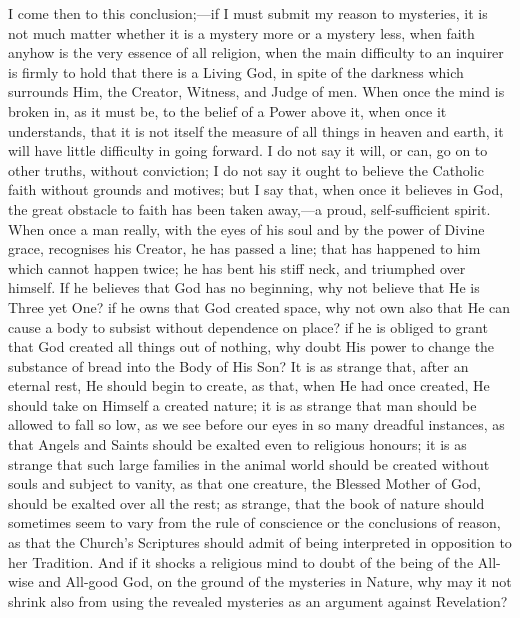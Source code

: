 I come then to this conclusion;—if I must submit my reason to
mysteries, it is not much matter whether it is a mystery more or a
mystery less, when faith anyhow is the very essence of all religion,
when the main difficulty to an inquirer is firmly to hold that there
is a Living God, in spite of the darkness which surrounds Him, the
Creator, Witness, and Judge of men. When once the mind is broken in,
as it must be, to the belief of a Power above it, when once it
understands, that it is not itself the measure of all things in heaven
and earth, it will have little difficulty in going forward. I do not
say it will, or can, go on to other truths, without conviction; I do
not say it ought to believe the Catholic faith without grounds and
motives; but I say that, when once it believes in God, the great
obstacle to faith has been taken away,—a proud, self-sufficient
spirit. When once a man really, with the eyes of his soul and by the
power of Divine grace, recognises his Creator, he has passed a line;
that has happened to him which cannot happen twice; he has bent his
stiff neck, and triumphed over himself. If he believes that God has no
beginning, why not believe that He is Three yet One? if he owns that
God created space, why not own also that He can cause a body to
subsist without dependence on place? if he is obliged to grant that
God created all things out of nothing, why doubt His power to change
the substance of bread into the Body of His Son? It is as strange
that, after an eternal rest, He should begin to create, as that, when
He had once created, He should take on Himself a created nature; it is
as strange that man should be allowed to fall so low, as we see before
our eyes in so many dreadful instances, as that Angels and Saints
should be exalted even to religious honours; it is as strange that
such large families in the animal world should be created without
souls and subject to vanity, as that one creature, the Blessed Mother
of God, should be exalted over all the rest; as strange, that the book
of nature should sometimes seem to vary from the rule of conscience or
the conclusions of reason, as that the Church's Scriptures should
admit of being interpreted in opposition to her Tradition. And if it
shocks a religious mind to doubt of the being of the All-wise and
All-good God, on the ground of the mysteries in Nature, why may it not
shrink also from using the revealed mysteries as an argument against
Revelation?

